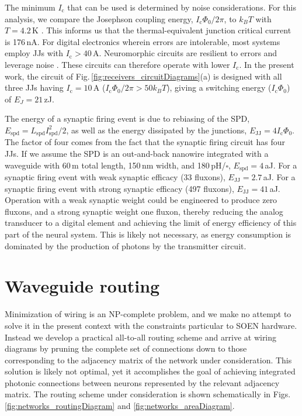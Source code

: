 \documentclass[twocolumn]{article}
\begin{document}
The minimum $I_{\mathrm{c}}$ that can be used is determined by noise considerations. For this analysis, we compare the Josephson coupling energy, $I_{\mathrm{c}}\Phi_0/2\pi$, to $k_B T$ with $T = 4.2$\,K \cite{lise1991}. This informs us that the thermal-equivalent junction critical current is 176\,nA. For digital electronics wherein errors are intolerable, most systems employ JJs with $I_{\mathrm{c}} > 40$\,\textmu A. Neuromorphic circuits are resilient to errors and leverage noise \cite{vrso1996,vora2005,stgo2005}. These circuits can therefore operate with lower $I_{\mathrm{c}}$. In the present work, the circuit of Fig.\,\ref{fig:receivers_circuitDiagrams}(a) is designed with all three JJs having $I_{\mathrm{c}} = 10$\,\textmu A ($I_{\mathrm{c}}\Phi_0/2\pi > 50 k_B T$), giving a switching energy ($I_{\mathrm{c}}\Phi_0$) of $E_{J} = 21$\,zJ.

The energy of a synaptic firing event is due to rebiasing of the SPD, $E_{\mathrm{spd}} = L_{\mathrm{spd}}I_{\mathrm{spd}}^2/2$, as well as the energy dissipated by the junctions, $E_{\mathrm{JJ}} = 4I_{\mathrm{c}}\Phi_0$. The factor of four comes from the fact that the synaptic firing circuit has four JJs. If we assume the SPD is an out-and-back nanowire integrated with a waveguide \cite{spga2011,pesc2012,feka2015,shbu2017b} with 60\,\textmu m total length, 150\,nm width, and 180\,pH/$\square$, $E_{\mathrm{spd}} = 4$\,aJ. For a synaptic firing event with weak synaptic efficacy (33 fluxons), $E_{\mathrm{JJ}} = 2.7$\,aJ. For a synaptic firing event with strong synaptic efficacy (497 fluxons), $E_{\mathrm{JJ}} = 41$\,aJ. Operation with a weak synaptic weight could be engineered to produce zero fluxons, and a strong synaptic weight one fluxon, thereby reducing the analog transducer to a digital element and achieving the limit of energy efficiency of this part of the neural system. This is likely not necessary, as energy consumption is dominated by the production of photons by the transmitter circuit.
	
\section{\label{apx:sectorRouting}Waveguide routing}
Minimization of wiring is an NP-complete problem, and we make no attempt to solve it in the present context with the constraints particular to SOEN hardware. Instead we develop a practical all-to-all routing scheme and arrive at wiring diagrams by pruning the complete set of connections down to those corresponding to the adjacency matrix of the network under consideration. This solution is likely not optimal, yet it accomplishes the goal of achieving integrated photonic connections between neurons represented by the relevant adjacency matrix. The routing scheme under consideration is shown schematically in Figs.\,\ref{fig:networks_routingDiagram} and \ref{fig:networks_areaDiagram}.
\end{document}
